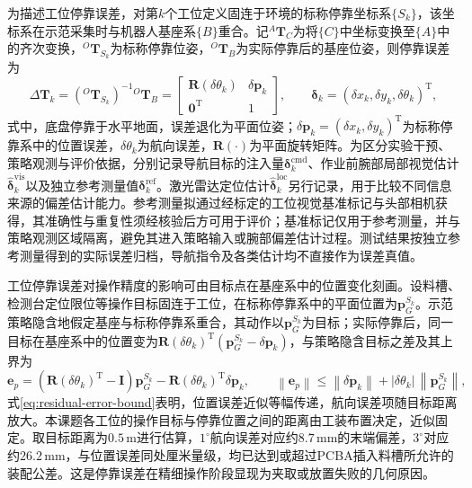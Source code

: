 为描述工位停靠误差，对第\(k\)个工位定义固连于环境的标称停靠坐标系\(\{S_k\}\)，该坐标系在示范采集时与机器人基座系\(\{B\}\)重合。记\({}^{A}\mathbf T_C\)为将\(\{C\}\)中坐标变换至\(\{A\}\)中的齐次变换，\({}^{O}\mathbf T_{S_k}\)为标称停靠位姿，\({}^{O}\mathbf T_B\)为实际停靠后的基座位姿，则停靠误差为
\begin{equation}
  \Delta\mathbf T_k
  =
  \left({}^{O}\mathbf T_{S_k}\right)^{-1}{}^{O}\mathbf T_B
  =
  \begin{bmatrix}
    \mathbf R(\delta\theta_k) & \delta\mathbf p_k \\
    \mathbf 0^{\mathrm T} & 1
  \end{bmatrix},
  \qquad
  \boldsymbol\delta_k
  =
  \left(\delta x_k,\delta y_k,\delta\theta_k\right)^{\mathrm T},
  \label{eq:station-frame-residual}
\end{equation}
式中，底盘停靠于水平地面，误差退化为平面位姿；\(\delta\mathbf p_k=(\delta x_k,\delta y_k)^{\mathrm T}\)为标称停靠系中的位置误差，\(\delta\theta_k\)为航向误差，\(\mathbf R(\cdot)\)为平面旋转矩阵。为区分实验干预、策略观测与评价依据，分别记录导航目标的注入量\(\boldsymbol\delta_k^{\mathrm{cmd}}\)、作业前腕部局部视觉估计\(\widehat{\boldsymbol\delta}_k^{\mathrm{vis}}\)以及独立参考测量值\(\boldsymbol\delta_k^{\mathrm{ref}}\)。激光雷达定位估计\(\widehat{\boldsymbol\delta}_k^{\mathrm{loc}}\)另行记录，用于比较不同信息来源的偏差估计能力。参考测量拟通过经标定的工位视觉基准标记与头部相机获得，其准确性与重复性须经核验后方可用于评价；基准标记仅用于参考测量，并与策略观测区域隔离，避免其进入策略输入或腕部偏差估计过程。测试结果按独立参考测量得到的实际误差归档，导航指令及各类估计均不直接作为误差真值。

工位停靠误差对操作精度的影响可由目标点在基座系中的位置变化刻画。设料槽、检测台定位限位等操作目标固连于工位，在标称停靠系中的平面位置为\(\mathbf p^{S_k}_G\)。示范策略隐含地假定基座与标称停靠系重合，其动作以\(\mathbf p^{S_k}_G\)为目标；实际停靠后，同一目标在基座系中的位置变为\(\mathbf R(\delta\theta_k)^{\mathrm T}(\mathbf p^{S_k}_G-\delta\mathbf p_k)\)，与策略隐含目标之差及其上界为
\begin{equation}
  \mathbf e_p
  =
  \left(\mathbf R(\delta\theta_k)^{\mathrm T}-\mathbf I\right)\mathbf p^{S_k}_G
  -\mathbf R(\delta\theta_k)^{\mathrm T}\delta\mathbf p_k,
  \qquad
  \left\|\mathbf e_p\right\|
  \le
  \left\|\delta\mathbf p_k\right\|
  +
  \left|\delta\theta_k\right|\,\left\|\mathbf p^{S_k}_G\right\|,
  \label{eq:residual-error-bound}
\end{equation}
式\eqref{eq:residual-error-bound}表明，位置误差近似等幅传递，航向误差项随目标距离放大。本课题各工位的操作目标与停靠位置之间的距离由工装布置决定，近似固定。取目标距离为\(0.5\,\mathrm{m}\)进行估算，\(1^\circ\)航向误差对应约\(8.7\,\mathrm{mm}\)的末端偏差，\(3^\circ\)对应约\(26.2\,\mathrm{mm}\)，与位置误差同处厘米量级，均已达到或超过PCBA插入料槽所允许的装配公差。这是停靠误差在精细操作阶段显现为夹取或放置失败的几何原因。

